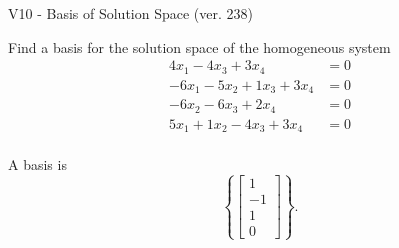 \begin{exercise}
  \begin{exerciseTitle}V10 - Basis of Solution Space (ver. 238)\end{exerciseTitle}
  \begin{exerciseStatement}
    Find a basis for the solution space of the homogeneous system 
\begin{align*}
 4 x_ 1 -4 x_ 3 + 3 x_ 4 &= 0  \\ 
  -6 x_ 1 -5 x_ 2 + 1 x_ 3 + 3 x_ 4 &= 0  \\ 
  -6 x_ 2 -6 x_ 3 + 2 x_ 4 &= 0  \\ 
  5 x_ 1 + 1 x_ 2 -4 x_ 3 + 3 x_ 4 &= 0  \\ 
 \end{align*}


 
  \end{exerciseStatement}

  \begin{exerciseAnswer}
   A basis is   
\[\left\{\left[\begin{array}{c}
1 \\
-1 \\
1 \\
0
\end{array}\right]\right\}.\]

  


  \end{exerciseAnswer}
\end{exercise}